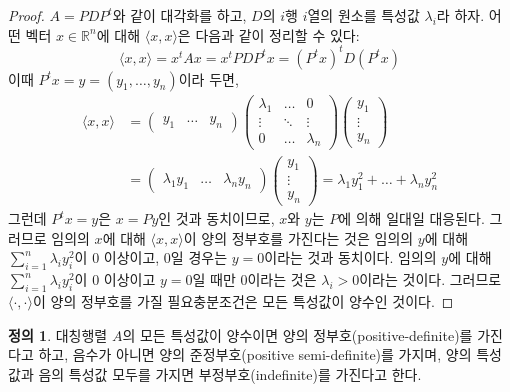 \documentclass[unfonts,oneside,a4paper]{oblivoir}
\theoremstyle{definition}
\newtheorem{definition}{정의}[section]
\theoremstyle{theorem}
\theoremstyle{theorem}
\theoremstyle{remark}
\theoremstyle{remark}
\theoremstyle{remark}
\theoremstyle{remark}
\renewcommand{\vec}[1]{\bm{\mathit{#1}}}
\newcommand{\vecz}{\bm{\mathrm{0}}}
\begin{document}
\begin{proof}
    $A = PDP^t$와 같이 대각화를 하고, $D$의 $i$행 $i$열의 원소를 특성값 $\lambda_i$라 하자.
    어떤 벡터 $\vec x \in \mathbb R^n$에 대해 $\langle \vec x, \vec x\rangle$은 다음과 같이 정리할 수 있다:
    \begin{equation*}
        \langle \vec x, \vec x\rangle = \vec x^t A \vec x = \vec x^t PDP^t \vec x = (P^t \vec x)^t D (P^t \vec x)
    \end{equation*}
    이때 $P^t \vec x = \vec y = (y_1, \dots, y_n)$이라 두면,
    \begin{align*}
        \langle \vec x, \vec x\rangle &=
        \begin{pmatrix}
            y_1 & \dots & y_n
        \end{pmatrix}
        \begin{pmatrix}
            \lambda_1 & \dots & 0\\
            \vdots & \ddots & \vdots\\
            0 & \dots & \lambda_n
        \end{pmatrix}
        \begin{pmatrix}
            y_1 \\ \vdots \\ y_n
        \end{pmatrix}\\
                                      &=
        \begin{pmatrix}
            \lambda_1 y_1 & \dots & \lambda_n y_n
        \end{pmatrix}
        \begin{pmatrix}
            y_1 \\ \vdots \\ y_n
        \end{pmatrix}
        = \lambda_1 y_1^2 + \dots + \lambda_n y_n^2
    \end{align*}
    그런데 $P^t \vec x = \vec y$은 $\vec x = P \vec y$인 것과 동치이므로, $\vec x$와 $\vec y$는 $P$에 의해 일대일 대응된다.
    그러므로 임의의 $\vec x$에 대해 $\langle \vec x, \vec x\rangle$이 양의 정부호를 가진다는 것은 임의의 $\vec y$에 대해 $\sum_{i = 1}^n \lambda_i y_i^2$이 0 이상이고, 0일 경우는 $\vec y = \vecz$이라는 것과 동치이다.
    임의의 $\vec y$에 대해 $\sum_{i = 1}^n \lambda_i y_i^2$이 0 이상이고 $\vec y = \vecz$일 때만 0이라는 것은 $\lambda_i > 0$이라는 것이다.
    그러므로 $\langle \cdot, \cdot \rangle$이 양의 정부호를 가질 필요충분조건은 모든 특성값이 양수인 것이다.
\end{proof}

\begin{definition}
    대칭행렬 $A$의 모든 특성값이 양수이면 양의 정부호(positive-definite)를 가진다고 하고, 음수가 아니면 양의 준정부호(positive semi-definite)를 가지며, 양의 특성값과 음의 특성값 모두를 가지면 부정부호(indefinite)를 가진다고 한다.
\end{definition}
\end{document}
